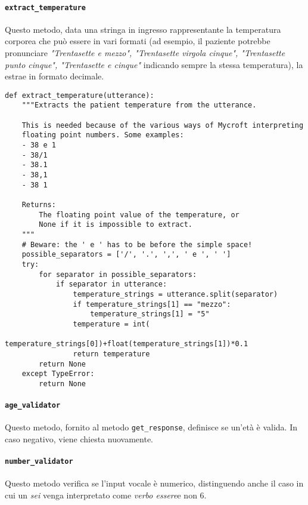 \paragraph{\texttt{extract\_temperature}} Questo metodo, data una stringa in ingresso rappresentante la temperatura corporea che può essere in vari formati (ad esempio, il paziente potrebbe pronunciare \textit{"Trentasette e mezzo", "Trentasette virgola cinque", "Trentasette punto cinque", "Trentasette e cinque"} indicando sempre la stessa temperatura), la estrae in formato decimale.
\begin{verbatim}
def extract_temperature(utterance):
    """Extracts the patient temperature from the utterance.

    This is needed because of the various ways of Mycroft interpreting
    floating point numbers. Some examples:
    - 38 e 1
    - 38/1
    - 38.1
    - 38,1
    - 38 1

    Returns:
        The floating point value of the temperature, or
        None if it is impossible to extract.
    """
    # Beware: the ' e ' has to be before the simple space!
    possible_separators = ['/', '.', ',', ' e ', ' ']
    try:
        for separator in possible_separators:
            if separator in utterance:
                temperature_strings = utterance.split(separator)
                if temperature_strings[1] == "mezzo":
                    temperature_strings[1] = "5"
                temperature = int(
                    temperature_strings[0])+float(temperature_strings[1])*0.1
                return temperature
        return None
    except TypeError:
        return None
\end{verbatim}
\paragraph{\texttt{age\_validator}} Questo metodo, fornito al metodo \texttt{get\_response}, definisce se un'età è valida. In caso negativo, viene chiesta nuovamente.
\paragraph{\texttt{number\_validator}} Questo metodo verifica se l'input vocale è numerico, distinguendo anche il caso in cui un \textit{sei} venga interpretato come \textit{verbo essere}e non $6$.
